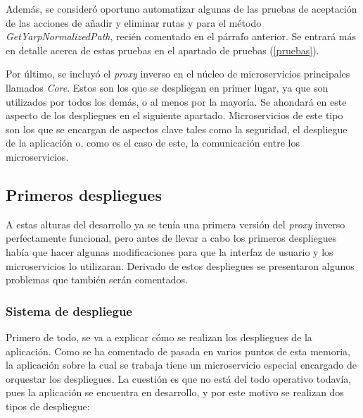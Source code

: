 \documentclass[11pt,spanish,listoffigures]{tfgetsinf}
\begin{document}
Además, se consideró oportuno automatizar algunas de las pruebas de aceptación de las acciones de añadir y eliminar rutas y para el método \emph{GetYarpNormalizedPath}, recién comentado en el párrafo anterior. Se entrará más en detalle acerca de estas pruebas en el apartado de pruebas (\ref{pruebas}).

Por último, se incluyó el \emph{proxy} inverso en el núcleo de microservicios principales llamados \emph{Core}. Estos son los que se despliegan en primer lugar, ya que son utilizados por todos los demás, o al menos por la mayoría. Se ahondará en este aspecto de los despliegues en el siguiente apartado. Microservicios de este tipo son los que se encargan de aspectos clave tales como la seguridad, el despliegue de la aplicación o, como es el caso de este, la comunicación entre los microservicios.


		\subsection{Primeros despliegues}

A estas alturas del desarrollo ya se tenía una primera versión del \emph{proxy} inverso perfectamente funcional, pero antes de llevar a cabo los primeros despliegues había que hacer algunas modificaciones para que la interfaz de usuario y los microservicios lo utilizaran. Derivado de estos despliegues se presentaron algunos problemas que también serán comentados.


			\subsubsection{Sistema de despliegue}

Primero de todo, se va a explicar cómo se realizan los despliegues de la aplicación. Como se ha comentado de pasada en varios puntos de esta memoria, la aplicación sobre la cual se trabaja tiene un microservicio especial encargado de orquestar los despliegues. La cuestión es que no está del todo operativo todavía, pues la aplicación se encuentra en desarrollo, y por este motivo se realizan dos tipos de despliegue:
\end{document}
